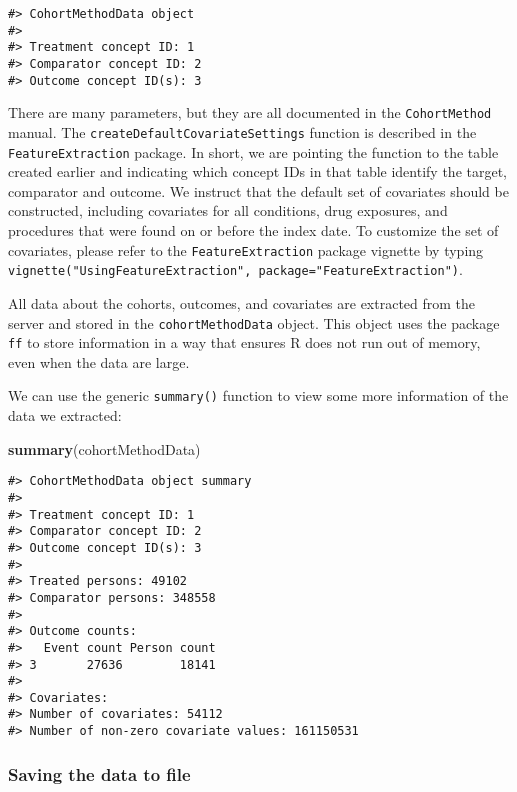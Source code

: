 \documentclass[]{article}
\newenvironment{Shaded}{\begin{snugshade}}{\end{snugshade}}
\newcommand{\KeywordTok}[1]{\textcolor[rgb]{0.13,0.29,0.53}{\textbf{#1}}}
\newcommand{\NormalTok}[1]{#1}
\begin{document}
\begin{verbatim}
#> CohortMethodData object
#> 
#> Treatment concept ID: 1
#> Comparator concept ID: 2
#> Outcome concept ID(s): 3
\end{verbatim}

There are many parameters, but they are all documented in the
\texttt{CohortMethod} manual. The
\texttt{createDefaultCovariateSettings} function is described in the
\texttt{FeatureExtraction} package. In short, we are pointing the
function to the table created earlier and indicating which concept IDs
in that table identify the target, comparator and outcome. We instruct
that the default set of covariates should be constructed, including
covariates for all conditions, drug exposures, and procedures that were
found on or before the index date. To customize the set of covariates,
please refer to the \texttt{FeatureExtraction} package vignette by
typing
\texttt{vignette("UsingFeatureExtraction",\ package="FeatureExtraction")}.

All data about the cohorts, outcomes, and covariates are extracted from
the server and stored in the \texttt{cohortMethodData} object. This
object uses the package \texttt{ff} to store information in a way that
ensures R does not run out of memory, even when the data are large.

We can use the generic \texttt{summary()} function to view some more
information of the data we extracted:

\begin{Shaded}
\begin{Highlighting}[]
\KeywordTok{summary}\NormalTok{(cohortMethodData)}
\end{Highlighting}
\end{Shaded}

\begin{verbatim}
#> CohortMethodData object summary
#> 
#> Treatment concept ID: 1
#> Comparator concept ID: 2
#> Outcome concept ID(s): 3
#> 
#> Treated persons: 49102
#> Comparator persons: 348558
#> 
#> Outcome counts:
#>   Event count Person count
#> 3       27636        18141
#> 
#> Covariates:
#> Number of covariates: 54112
#> Number of non-zero covariate values: 161150531
\end{verbatim}

\hypertarget{saving-the-data-to-file}{%
\subsubsection{Saving the data to file}\label{saving-the-data-to-file}}
\end{document}
